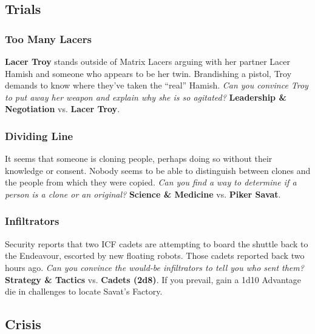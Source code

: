 \documentclass[11pt, a5paper, parskip=half-, DIV=12]{scrartcl}
\begin{document}
\subsection*{Trials}

\subsubsection*{Too Many Lacers}
\textbf{Lacer Troy} stands outside of Matrix Lacers arguing with her partner Lacer Hamish and someone who appears to be her twin. Brandishing a pistol, Troy demands to know where they've taken the ``real'' Hamish. \textit{Can you convince Troy to put away her weapon and explain why she is so agitated?} \textbf{Leadership \& Negotiation} vs. \textbf{Lacer Troy}.

\subsubsection*{Dividing Line}
It seems that someone is cloning people, perhaps doing so without their knowledge or consent. Nobody seems to be able to distinguish between clones and the people from which they were copied. \textit{Can you find a way to determine if a person is a clone or an original?} \textbf{Science \& Medicine} vs. \textbf{Piker Savat}.

\subsubsection*{Infiltrators}
Security reports that two ICF cadets are attempting to board the shuttle back to the Endeavour, escorted by new floating robots. Those cadets reported back two hours ago. \textit{Can you convince the would-be infiltrators to tell you who sent them?} \textbf{Strategy \& Tactics} vs. \textbf{Cadets (2d8)}. If you prevail, gain a 1d10 Advantage die in challenges to locate Savat's Factory. 

\subsection*{Crisis}
\end{document}
